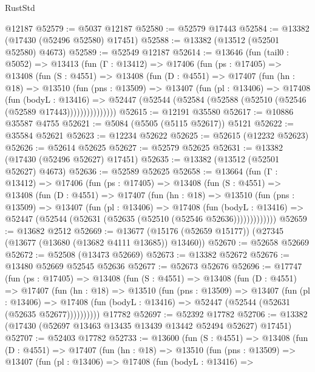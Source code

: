 \begin{lexlean}{RustStd}
\begin{coremodule}
    @12187
@52579 := @5037 @12187
@52580 := @52579 @17443
@52584 := @13382 (@17430 (@52496 @52580) @17451)
@52588 := @13382 (@13512 (@52501 @52580) @4673)
@52589 := @52549 @12187
@52614 := @13646
    (fun (tail0 : @5052) =>
    @13413
      (fun (Γ : @13412) =>
      @17406
        (fun (ps : @17405) =>
        @13408
          (fun (S : @4551) =>
          @13408
            (fun (D : @4551) =>
            @17407
              (fun (hn : @18) =>
              @13510
                (fun (pns : @13509) =>
                @13407
                  (fun (pl : @13406) =>
                  @17408
                    (fun (bodyL : @13416) =>
                    @52447 (@52544 (@52584 (@52588 (@52510 (@52546 (@52589 @17443)))))))))))))))
@52615 := @12191 @35580
@52617 := @10886 @35587 @4755
@52621 := @5084 (@5505 (@5115 @52617)) @5121
@52622 := @35584 @52621
@52623 := @12234 @52622
@52625 := @52615 (@12232 @52623)
@52626 := @52614 @52625
@52627 := @52579 @52625
@52631 := @13382 (@17430 (@52496 @52627) @17451)
@52635 := @13382 (@13512 (@52501 @52627) @4673)
@52636 := @52589 @52625
@52658 := @13664
    (fun (Γ : @13412) =>
    @17406
      (fun (ps : @17405) =>
      @13408
        (fun (S : @4551) =>
        @13408
          (fun (D : @4551) =>
          @17407
            (fun (hn : @18) =>
            @13510
              (fun (pns : @13509) =>
              @13407
                (fun (pl : @13406) =>
                @17408
                  (fun (bodyL : @13416) =>
                  @52447 (@52544 (@52631 (@52635 (@52510 (@52546 @52636)))))))))))))
@52659 := @13682 @2512
@52669 := @13677 (@15176 (@52659 @15177)) (@27345 (@13677 (@13680 (@13682 @4111 @13685)) @13460))
@52670 := @52658 @52669
@52672 := @52508 (@13473 @52669)
@52673 := @13382 @52672
@52676 := @13480 @52669 @52545 @52636
@52677 := @52673 @52676
@52696 := @17747
    (fun (ps : @17405) =>
    @13408
      (fun (S : @4551) =>
      @13408
        (fun (D : @4551) =>
        @17407
          (fun (hn : @18) =>
          @13510
            (fun (pns : @13509) =>
            @13407
              (fun (pl : @13406) =>
              @17408 (fun (bodyL : @13416) => @52447 (@52544 (@52631 (@52635 @52677))))))))))
    @17782
@52697 := @52392 @17782
@52706 := @13382 (@17430 (@52697 @13463 @13435 @13439 @13442 @52494 @52627) @17451)
@52707 := @52403 @17782
@52733 := @13600
    (fun (S : @4551) =>
    @13408
      (fun (D : @4551) =>
      @17407
        (fun (hn : @18) =>
        @13510
          (fun (pns : @13509) =>
          @13407
            (fun (pl : @13406) =>
            @17408
              (fun (bodyL : @13416) =>

\end{coremodule}
\end{lexlean}
